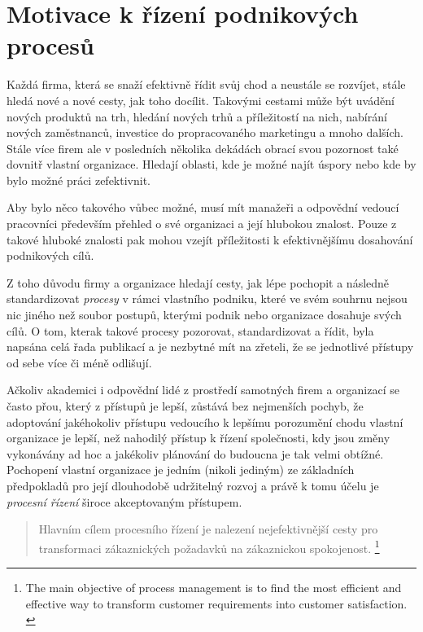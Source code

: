 \section{Motivace k řízení podnikových procesů}
Každá firma, která se snaží efektivně řídit svůj chod a neustále se rozvíjet, stále hledá nové a nové cesty, jak toho docílit. Takovými cestami může být uvádění nových produktů na trh, hledání nových trhů a příležitostí na nich, nabírání nových zaměstnanců, investice do propracovaného marketingu a mnoho dalších. Stále více firem ale v posledních několika dekádách obrací svou pozornost také dovnitř vlastní organizace. Hledají oblasti, kde je možné najít úspory nebo kde by bylo možné práci zefektivnit.

Aby bylo něco takového vůbec možné, musí mít manažeři a odpovědní vedoucí pracovníci především přehled o své organizaci a její hlubokou znalost. Pouze z takové hluboké znalosti pak mohou vzejít příležitosti k efektivnějšímu dosahování podnikových cílů.

Z toho důvodu firmy a organizace hledají cesty, jak lépe pochopit a následně standardizovat \textit{procesy} v rámci vlastního podniku, které ve svém souhrnu nejsou nic jiného než soubor postupů, kterými podnik nebo organizace dosahuje svých cílů. O tom, kterak takové procesy pozorovat, standardizovat a řídit, byla napsána celá řada publikací a je nezbytné mít na zřeteli, že se jednotlivé přístupy od sebe více či méně odlišují. 

Ačkoliv akademici i odpovědní lidé z prostředí samotných firem a organizací se často přou, který z přístupů je lepší, zůstává bez nejmenších pochyb, že adoptování jakéhokoliv přístupu vedoucího k lepšímu porozumění chodu vlastní organizace je lepší, než nahodilý přístup k řízení společnosti, kdy jsou změny vykonávány ad hoc a jakékoliv plánování do budoucna je tak velmi obtížné. Pochopení vlastní organizace je jedním (nikoli jediným) ze základních předpokladů pro její dlouhodobě udržitelný rozvoj a právě k tomu účelu je \textit{procesní řízení} široce akceptovaným přístupem.

\begin{quote}
Hlavním cílem procesního řízení je nalezení nejefektivnější cesty pro transformaci zákaznických požadavků na zákaznickou spokojenost. \cite{Peris-Ortiz2014}
\footnote{The main objective of process management is to find the most efficient and effective way to transform customer requirements into customer satisfaction. \cite{Peris-Ortiz2014}}
\end{quote}


